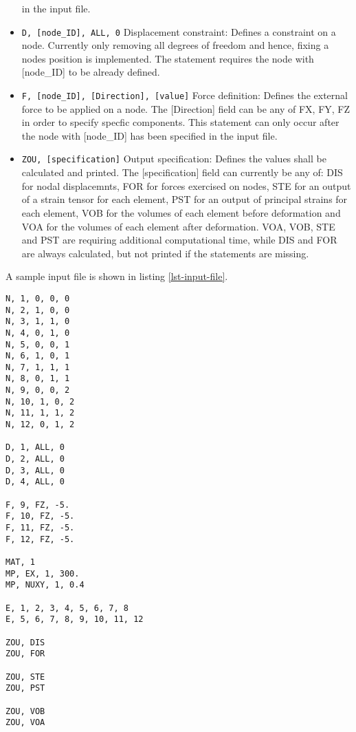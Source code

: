 \begin{itemize}
      in the input file.
\item {\tt D, [node\_ID], ALL, 0}
      Displacement constraint: Defines a constraint on a
      node. Currently only removing all degrees of freedom and hence,
      fixing a nodes position is implemented. The statement
      requires the node with [node\_ID] to be already defined.
\item {\tt F, [node\_ID], [Direction], [value]}
      Force definition: Defines the external force to be applied on a
      node.
      The [Direction] field can be any of FX, FY, FZ in order to specify specfic
      components. This statement can only occur after the node with
      [node\_ID] has been specified in the input file.
\item {\tt ZOU, [specification]}
      Output specification: Defines the values shall be calculated
      and printed.
      The [specification] field can currently be any of: DIS for nodal
      displacemnts, FOR for forces exercised on nodes, STE for an
      output of a strain tensor for each element, PST for an output of
      principal strains for each element, VOB for the volumes of each
      element before deformation and VOA for the volumes of each
      element after deformation. VOA, VOB, STE and PST are requiring
      additional computational time, while DIS and FOR are always calculated,
      but not printed if the statements are missing.
      
      
\end{itemize}

A sample input file is shown in listing \ref{lst-input-file}.
\begin{lstlisting}
N, 1, 0, 0, 0
N, 2, 1, 0, 0
N, 3, 1, 1, 0
N, 4, 0, 1, 0
N, 5, 0, 0, 1
N, 6, 1, 0, 1
N, 7, 1, 1, 1
N, 8, 0, 1, 1
N, 9, 0, 0, 2
N, 10, 1, 0, 2
N, 11, 1, 1, 2
N, 12, 0, 1, 2

D, 1, ALL, 0
D, 2, ALL, 0
D, 3, ALL, 0
D, 4, ALL, 0

F, 9, FZ, -5.
F, 10, FZ, -5.
F, 11, FZ, -5.
F, 12, FZ, -5.

MAT, 1
MP, EX, 1, 300.
MP, NUXY, 1, 0.4

E, 1, 2, 3, 4, 5, 6, 7, 8
E, 5, 6, 7, 8, 9, 10, 11, 12

ZOU, DIS
ZOU, FOR

ZOU, STE
ZOU, PST

ZOU, VOB
ZOU, VOA
\end{lstlisting}

